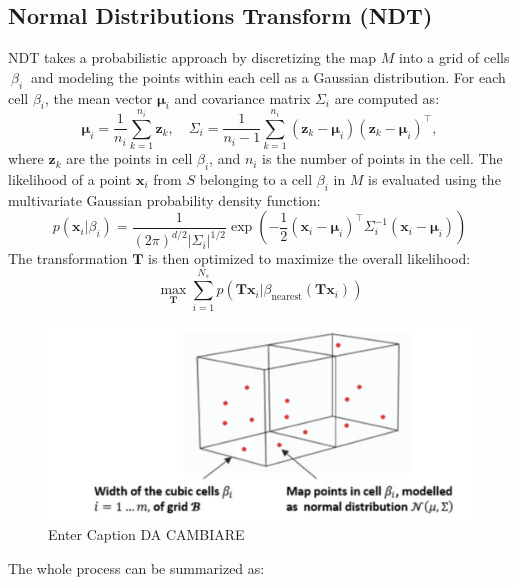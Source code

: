 \subsection*{Normal Distributions Transform (NDT)}
NDT takes a probabilistic approach by discretizing the map \( M \) into a grid of cells \( \ \beta_i \ \) and modeling the points within each cell as a Gaussian distribution. For each cell \( \beta_i \), the mean vector \( \boldsymbol{\mu}_i \) and covariance matrix \( \Sigma_i \) are computed as:
\begin{equation}
    \boldsymbol{\mu}_i = \frac{1}{n_i} \sum_{k=1}^{n_i} \mathbf{z}_k, \quad
    \Sigma_i = \frac{1}{n_i - 1} \sum_{k=1}^{n_i} (\mathbf{z}_k - \boldsymbol{\mu}_i)(\mathbf{z}_k - \boldsymbol{\mu}_i)^\top,
\end{equation}
where \( \mathbf{z}_k \) are the points in cell \( \beta_i \), and \( n_i \) is the number of points in the cell.
The likelihood of a point \( \mathbf{x}_i \) from \( S \) belonging to a cell \( \beta_i \) in \( M \) is evaluated using the multivariate Gaussian probability density function:
\begin{equation}
    p(\mathbf{x}_i | \beta_i) = \frac{1}{(2\pi)^{d/2} |\Sigma_i|^{1/2}} \exp\left(-\frac{1}{2} (\mathbf{x}_i - \boldsymbol{\mu}_i)^\top \Sigma_i^{-1} (\mathbf{x}_i - \boldsymbol{\mu}_i)\right)
\end{equation}
The transformation \( \mathbf{T} \) is then optimized to maximize the overall likelihood:
\begin{equation}
    \max_{\mathbf{T}} \sum_{i=1}^{N_s} p(\mathbf{T} \mathbf{x}_i | \beta_{\text{nearest}}(\mathbf{T} \mathbf{x}_i))
\end{equation} 
\begin{figure}[H]
    \centering
    \includegraphics[width=0.75\linewidth]{LateX//figs/NDT.png}
    \caption{Enter Caption DA CAMBIARE}
    \label{fig:enter-label}
\end{figure}
The whole process can be summarized as:
